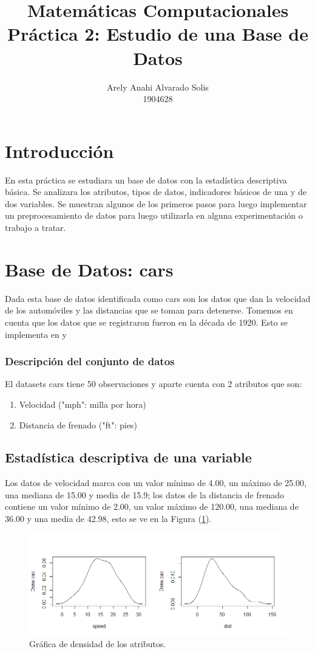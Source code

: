 \documentclass[12pt,a4paper]{article}
\title{Matemáticas Computacionales \\ Práctica 2: Estudio de una Base de Datos}
\author{Arely Anahi Alvarado Solis \\ 1904628}
\date{}
\begin{document}
\maketitle

\section{Introducción} \label{sec:intro}
En esta práctica se estudiara un base de datos con la estadística descriptiva básica. Se analizara los atributos, tipos de datos, indicadores básicos de una y de dos variables. Se muestran algunos de los primeros pasos para luego implementar un preprocesamiento de datos para luego utilizarla en alguna experimentación o trabajo a tratar.

\section{Base de Datos: cars}
Dada esta base de datos identificada como cars son los datos que dan la velocidad de los automóviles y las distancias que se toman para detenerse. Tomemos en cuenta que los datos que se registraron fueron en la década de 1920. Esto se implementa en \citep{data} y \citep{correlation}

\subsubsection{Descripción del conjunto de datos}
El datasets cars tiene 50 observaciones y aparte cuenta con 2 atributos que son:
\begin{enumerate}
       \item Velocidad ("mph": milla por hora)
       \item Distancia de frenado ("ft": pies)
\end{enumerate}

\subsection{Estadística descriptiva de una variable} \label{subsec:estadistdescrpuna}
Los datos de velocidad marca con un valor mínimo de 4.00, un máximo de 25.00, una mediana de 15.00 y media de 15.9; los datos de la distancia de frenado contiene un valor mínimo de 2.00, un valor máximo de 120.00, una mediana de 36.00 y una media de 42.98, esto se ve en la Figura (\ref{fig:densidad}).

\begin{figure}
\centering
\includegraphics[scale=0.5]{densidad}
\caption{Gráfica de densidad de los atributos.}
\label{fig:densidad}
\end{figure} 
\end{document}
